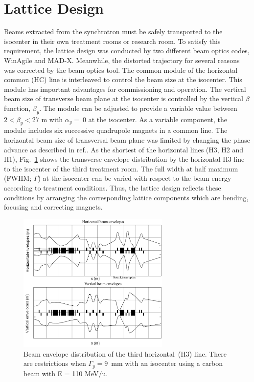 \documentclass[jkps,preprint,fleqn,showpacs,showkeys,10pt,twocolumn]{revtex4}
\begin{document}
\section{Lattice Design}
\label{sec:Lat}
Beams extracted from the synchrotron must be safely transported to the isocenter in their own treatment rooms or research room.
To satisfy this requirement, the lattice design was conducted by two different beam optics codes, WinAgile\cite{Agile0,Agile1} and MAD-X\cite{Schmidt}.
Meanwhile, the distorted trajectory for several reasons was corrected by the beam optics tool\cite{Chawon}.
The common module of the horizontal common (HC) line is interleaved to control the beam size at the isocenter.
This module has important advantages for commissioning and operation. 
The vertical beam size of transverse beam plane at the isocenter is controlled by the vertical $\beta$ function, $\beta_{y}$.  
The module can be adjusted to provide a variable value between $2 < \beta_{y} < 27$ m with $\alpha_{y} = ~0$ at the isocenter. 
As a variable component, the module includes six successive quadrupole magnets in a common line.
The horizontal beam size of transversal beam plane was limited by changing the phase advance as described in ref.\cite{Chawon}. 
As the shortest of the horizontal lines (H3, H2 and H1), 
Fig.~\ref{fig1} shows the transverse envelope distribution by the horizontal H3 line to the isocenter of the third treatment room. 
The full width at half maximum (FWHM; $\Gamma$) at the isocenter can be varied with respect to the beam energy according to treatment conditions.
Thus, the lattice design reflects these conditions by arranging the corresponding lattice components which are bending, focusing and correcting magnets.
\begin{figure}[h]
  \begin{center}
    \includegraphics[width=7.5cm]{Fig02.png}  
    \caption{Beam envelope distribution of the third horizontal~(H3) line.
      There are restrictions when $\Gamma_{y} = 9$~mm with an isocenter using a carbon beam with E = 110 MeV/u.}
    \label{fig1}
  \end{center}
\end{figure}
\end{document}
